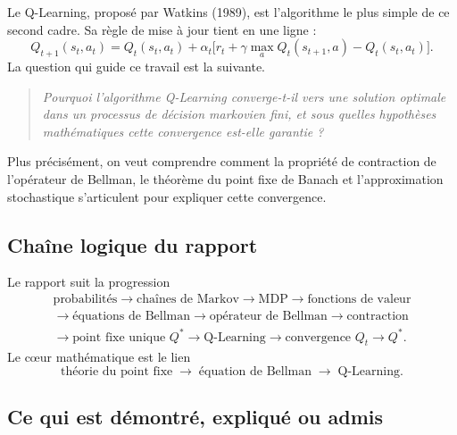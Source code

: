 \documentclass[11pt,a4paper]{article}
\theoremstyle{plain}
\theoremstyle{definition}
\theoremstyle{remark}
\newcommand{\1}{\mathbf{1}}
\begin{document}
Le Q-Learning, proposé par Watkins (1989), est l'algorithme le plus simple de ce second cadre. Sa règle de mise à jour tient en une ligne :
\[
Q_{t+1}(s_t,a_t)=Q_t(s_t,a_t)+\alpha_t\Big[r_t+\gamma\max_a Q_t(s_{t+1},a)-Q_t(s_t,a_t)\Big].
\]
La question qui guide ce travail est la suivante.

\begin{quote}
\emph{Pourquoi l'algorithme Q-Learning converge-t-il vers une solution optimale dans un processus de décision markovien fini, et sous quelles hypothèses mathématiques cette convergence est-elle garantie ?}
\end{quote}

Plus précisément, on veut comprendre comment la propriété de contraction de l'opérateur de Bellman, le théorème du point fixe de Banach et l'approximation stochastique s'articulent pour expliquer cette convergence.

\subsection{Chaîne logique du rapport}

Le rapport suit la progression
\begin{gather*}
\text{probabilités}\to\text{chaînes de Markov}\to\text{MDP}\to\text{fonctions de valeur}\\
\to\text{équations de Bellman}\to\text{opérateur de Bellman}\to\text{contraction}\\
\to\text{point fixe unique }Q^*\to\text{Q-Learning}\to\text{convergence }Q_t\to Q^*.
\end{gather*}
Le cœur mathématique est le lien
\[
\boxed{\text{théorie du point fixe}\;\longrightarrow\;\text{équation de Bellman}\;\longrightarrow\;\text{Q-Learning}.}
\]

\subsection{Ce qui est démontré, expliqué ou admis}
\end{document}
